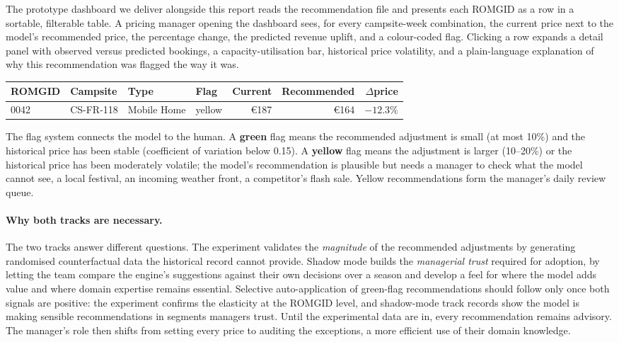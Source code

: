 \documentclass[11pt,a4paper]{article}
\begin{document}
The prototype dashboard we deliver alongside this report reads the recommendation file and presents each ROMGID as a row in a sortable, filterable table. A pricing manager opening the dashboard sees, for every campsite-week combination, the current price next to the model's recommended price, the percentage change, the predicted revenue uplift, and a colour-coded flag. Clicking a row expands a detail panel with observed versus predicted bookings, a capacity-utilisation bar, historical price volatility, and a plain-language explanation of why this recommendation was flagged the way it was.

\begin{center}
\small
\begin{tabular}{@{}llllrrr@{}}
\toprule
\textbf{ROMGID} & \textbf{Campsite} & \textbf{Type} & \textbf{Flag} & \textbf{Current} & \textbf{Recommended} & \textbf{$\Delta$price} \\
\midrule
0042 & CS-FR-118 & Mobile Home & \colorbox{accent4!25}{yellow} & \euro{}187 & \euro{}164 & $-12.3\%$ \\
\bottomrule
\end{tabular}
\end{center}

The flag system connects the model to the human. A \textbf{green} flag means the recommended adjustment is small (at most 10\%) and the historical price has been stable (coefficient of variation below 0.15). A \textbf{yellow} flag means the adjustment is larger (10--20\%) or the historical price has been moderately volatile; the model's recommendation is plausible but needs a manager to check what the model cannot see, a local festival, an incoming weather front, a competitor's flash sale. Yellow recommendations form the manager's daily review queue.

\paragraph{Why both tracks are necessary.} The two tracks answer different questions. The experiment validates the \emph{magnitude} of the recommended adjustments by generating randomised counterfactual data the historical record cannot provide. Shadow mode builds the \emph{managerial trust} required for adoption, by letting the team compare the engine's suggestions against their own decisions over a season and develop a feel for where the model adds value and where domain expertise remains essential. Selective auto-application of green-flag recommendations should follow only once both signals are positive: the experiment confirms the elasticity at the ROMGID level, and shadow-mode track records show the model is making sensible recommendations in segments managers trust. Until the experimental data are in, every recommendation remains advisory. The manager's role then shifts from setting every price to auditing the exceptions, a more efficient use of their domain knowledge.
\end{document}
